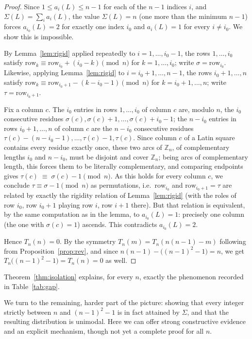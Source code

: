 \documentclass[11pt]{amsart}
\begin{document}
\begin{proof}
Since $1\le a_i(L)\le n-1$ for each of the $n-1$ indices $i$, and $\Sigma(L)=\sum_i a_i(L)$, the value $\Sigma(L)=n$ (one more than the minimum $n-1$) forces $a_{i_0}(L)=2$ for exactly one index $i_0$ and $a_i(L)=1$ for every $i\ne i_0$. We show this is impossible.

By Lemma~\ref{lem:rigid} applied repeatedly to $i=1,\dots,i_0-1$, the rows $1,\dots,i_0$ satisfy $\mathrm{row}_k \equiv \mathrm{row}_{i_0}+(i_0-k)\pmod n$ for $k=1,\dots,i_0$; write $\sigma=\mathrm{row}_{i_0}$. Likewise, applying Lemma~\ref{lem:rigid} to $i=i_0+1,\dots,n-1$, the rows $i_0+1,\dots,n$ satisfy $\mathrm{row}_k\equiv \mathrm{row}_{i_0+1}-(k-i_0-1)\pmod n$ for $k=i_0+1,\dots,n$; write $\tau=\mathrm{row}_{i_0+1}$.

Fix a column $c$. The $i_0$ entries in rows $1,\dots,i_0$ of column $c$ are, modulo $n$, the $i_0$ consecutive residues $\sigma(c),\sigma(c)+1,\dots,\sigma(c)+i_0-1$; the $n-i_0$ entries in rows $i_0+1,\dots,n$ of column $c$ are the $n-i_0$ consecutive residues $\tau(c)-(n-i_0-1),\dots,\tau(c)-1,\tau(c)$. Since column $c$ of a Latin square contains every residue exactly once, these two arcs of $\mathbb Z_n$, of complementary lengths $i_0$ and $n-i_0$, must be disjoint and cover $\mathbb Z_n$; being arcs of complementary length, this forces them to be literally complementary, and comparing endpoints gives $\tau(c)\;\equiv\;\sigma(c)-1 \pmod n .$
As this holds for every column $c$, we conclude $\tau\equiv\sigma-1\pmod n$ as permutations, i.e.\ $\mathrm{row}_{i_0}$ and $\mathrm{row}_{i_0+1}=\tau$ are related by exactly the rigidity relation of Lemma~\ref{lem:rigid} (with the roles of row $i_0$, row $i_0+1$ playing row $i$, row $i+1$ there). But that relation is equivalent, by the same computation as in the lemma, to $a_{i_0}(L)=1$: precisely one column (the one with $\sigma(c)=1$) ascends. This contradicts $a_{i_0}(L)=2$.

Hence $T_n(n)=0$. By the symmetry $T_n(m)=T_n(n(n-1)-m)$ following from Proposition~\ref{prop:rev}, and since $n(n-1)-\bigl((n-1)^2-1\bigr)=n$, we get $T_n\bigl((n-1)^2-1\bigr)=T_n(n)=0$ as well.
\end{proof}

Theorem~\ref{thm:isolation} explains, for every $n$, exactly the phenomenon recorded in Table~\ref{tab:gap}.

We turn to the remaining, harder part of the picture: showing that every integer strictly between $n$ and $(n-1)^2-1$ is in fact attained by $\Sigma$, and that the resulting distribution is unimodal. Here we can offer strong constructive evidence and an explicit mechanism, though not yet a complete proof for all $n$.
\end{document}
